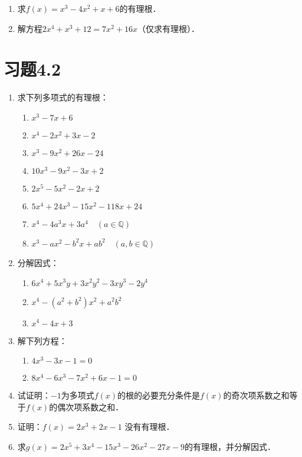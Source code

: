 \begin{ex}
\begin{enumerate}
    \item 求$f(x)=x^3-4x^2+x+6$的有理根．
    \item 解方程$2x^4+x^3+12=7x^2+16x$（仅求有理根）．
\end{enumerate}
\end{ex}

\section*{习题4.2}
\begin{enumerate}
    \item 求下列多项式的有理根：
    \begin{multicols}{2}
  \begin{enumerate}
\item $x^3-7x+6$
\item $x^4-2x^2+3x-2$
\item $x^3-9x^2+26x-24$
\item $10x^3-9x^2-3x+2$
\item $2x^5-5x^2-2x+2$
\item $5x^4+24x^3-15x^2-118x+24$
\item $x^4-4a^3x+3a^4\quad (a\in\mathbb{Q})$
\item $x^3-ax^2-b^2x+ab^2\quad (a,b\in\mathbb{Q})$
\end{enumerate}      
    \end{multicols}
\item 分解因式：
\begin{enumerate}
    \item $6x^4+5x^3y+3x^2y^2-3xy^3-2y^4$
    \item $x^4-(a^2+b^2)x^2 +a^2b^2$
    \item $x^4-4x+3$
\end{enumerate}

\item 解下列方程：
\begin{enumerate}
    \item $4x^3-3x-1=0$
\item $8x^4-6x^3-7x^2+6x-1=0$
\end{enumerate}

\item 试证明：$-1$为多项式$f(x)$的根的必要充分条件是$f(x)$的奇次项系数之和等于$f(x)$的偶次项系数之和．

\item 证明：$f(x)=2x^3+2x-1$ 没有有理根．
\item 求$g(x)=2x^5+3x^4-15x^3-26x^2-27x-9$的有理根，并分解因式．
\end{enumerate}
    
